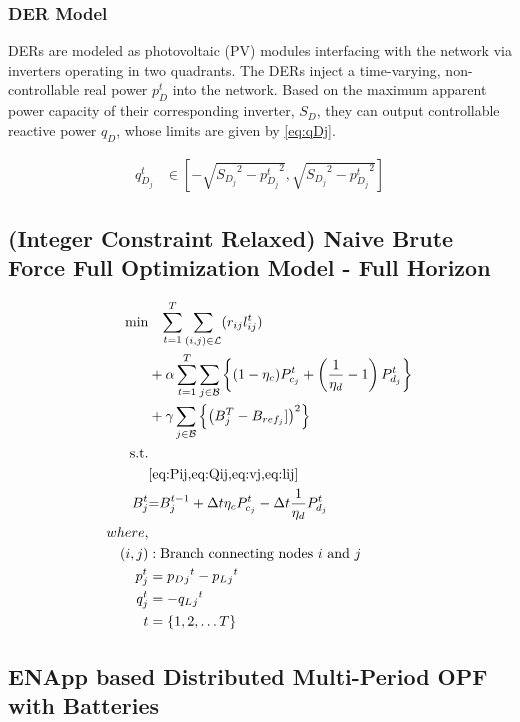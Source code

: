 \documentclass{article}
\begin{document}
\subsubsection{DER Model}

DERs are modeled as photovoltaic (PV) modules interfacing with the network via inverters operating in two quadrants. The DERs inject a time-varying, non-controllable real power $p^{t}_{D}$ into the network. Based on the maximum apparent power capacity of their corresponding inverter, $S_{D}$, they can output controllable reactive power $q_{D}$, whose limits are given by \cref{eq:qDj}.

\begin{align}
    { q^{t}_{D_{j}} } 
    &\in
    { \left[-\sqrt{ {S_{D_{j}}}^2 - {p^{t}_{D_{j}}}^2}, \sqrt{ {S_{D_{j}}}^2 - {p^{t}_{D_{j}}}^2}\right] } \label{eq:qDj}
\end{align}

\subsection*{(Integer Constraint Relaxed) Naive Brute Force Full Optimization Model - Full Horizon}

\begin{align}
    \min_{
    } 
    \vspace{-15ex} %
    & \quad
    {\sum_{t = 1}^{T} \sum_{(i, j) \in \mathcal{L}} (r_{ij}l_{ij}^t)}  \nonumber\\
    {} &+ {\alpha \sum_{t = 1}^{T} \sum_{j \in \mathcal{B}} \left\{ (1- \eta_c)P_{c_j}^t + \left(\frac{1}{\eta_d}-1\right) P_{d_j}^t \right\}} \nonumber\\
    {} &+ {\gamma \sum_{j \in \mathcal{B}} \left\{ \left(B^{T}_{j} - B_{ref_{j}}]\right)^2\right\}} \\
    \text{s.t.} & {}\nonumber \\
    {} & {\text{\cref{eq:Pij,eq:Qij,eq:vj,eq:lij}}} \\
    {\color{darkgreen}{ B_{j}^{t} }} &\color{darkgreen}{=} { \color{darkgreen}{ B_{j}^{t-1} + \Delta t  \eta_c P_{c_j}^t - \Delta t\frac{1}{\eta_d} P_{d_j}^t } } \\
    {where,} & {} \\
    {(i, j)} &: {\text{Branch connecting nodes $i$ and $j$}} \\
    {p_j^t} &= {p_D{_j}^t - p_L{_j}^t} \\
    {q_j^t} &= {-q_L{_j}^t} \\
    {t} &= {\{1, 2, \ldots T\}}
\end{align}

\subsection{ENApp based Distributed Multi-Period OPF with Batteries}
\end{document}
